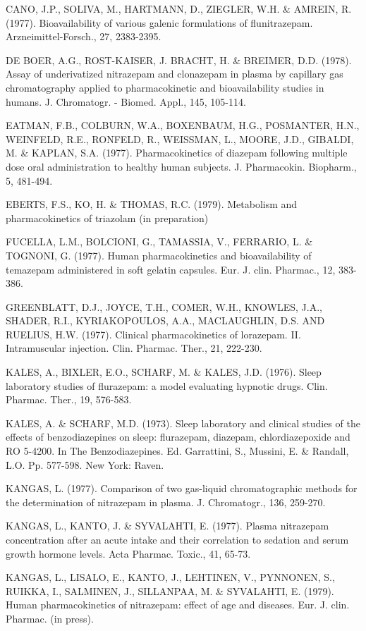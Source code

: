 \documentclass[10pt]{article}
\begin{document}
CANO, J.P., SOLIVA, M., HARTMANN, D., ZIEGLER, W.H. \& AMREIN, R. (1977). Bioavailability of various galenic formulations of flunitrazepam. Arzneimittel-Forsch., 27, 2383-2395.

DE BOER, A.G., ROST-KAISER, J. BRACHT, H. \& BREIMER, D.D. (1978). Assay of underivatized nitrazepam and clonazepam in plasma by capillary gas chromatography applied to pharmacokinetic and bioavailability studies in humans. J. Chromatogr. - Biomed. Appl., 145, 105-114.

EATMAN, F.B., COLBURN, W.A., BOXENBAUM, H.G., POSMANTER, H.N., WEINFELD, R.E., RONFELD, R., WEISSMAN, L., MOORE, J.D., GIBALDI, M. \& KAPLAN, S.A. (1977). Pharmacokinetics of diazepam following multiple dose oral administration to healthy human subjects. J. Pharmacokin. Biopharm., 5, 481-494.

EBERTS, F.S., KO, H. \& THOMAS, R.C. (1979). Metabolism and pharmacokinetics of triazolam (in preparation)

FUCELLA, L.M., BOLCIONI, G., TAMASSIA, V., FERRARIO, L. \& TOGNONI, G. (1977). Human pharmacokinetics and bioavailability of temazepam administered in soft gelatin capsules. Eur. J. clin. Pharmac., 12, 383-386.

GREENBLATT, D.J., JOYCE, T.H., COMER, W.H., KNOWLES, J.A., SHADER, R.I., KYRIAKOPOULOS, A.A., MACLAUGHLIN, D.S. AND RUELIUS, H.W. (1977). Clinical pharmacokinetics of lorazepam. II. Intramuscular injection. Clin. Pharmac. Ther., 21, 222-230.

KALES, A., BIXLER, E.O., SCHARF, M. \& KALES, J.D. (1976). Sleep laboratory studies of flurazepam: a model evaluating hypnotic drugs. Clin. Pharmac. Ther., 19, 576-583.

KALES, A. \& SCHARF, M.D. (1973). Sleep laboratory and clinical studies of the effects of benzodiazepines on sleep: flurazepam, diazepam, chlordiazepoxide and RO 5-4200. In The Benzodiazepines. Ed. Garrattini, S., Mussini, E. \& Randall, L.O. Pp. 577-598. New York: Raven.

KANGAS, L. (1977). Comparison of two gas-liquid chromatographic methods for the determination of nitrazepam in plasma. J. Chromatogr., 136, 259-270.

KANGAS, L., KANTO, J. \& SYVALAHTI, E. (1977). Plasma nitrazepam concentration after an acute intake and their correlation to sedation and serum growth hormone levels. Acta Pharmac. Toxic., 41, 65-73.

KANGAS, L., LISALO, E., KANTO, J., LEHTINEN, V., PYNNONEN, S., RUIKKA, I., SALMINEN, J., SILLANPAA, M. \& SYVALAHTI, E. (1979). Human pharmacokinetics of nitrazepam: effect of age and diseases. Eur. J. clin. Pharmac. (in press).
\end{document}
